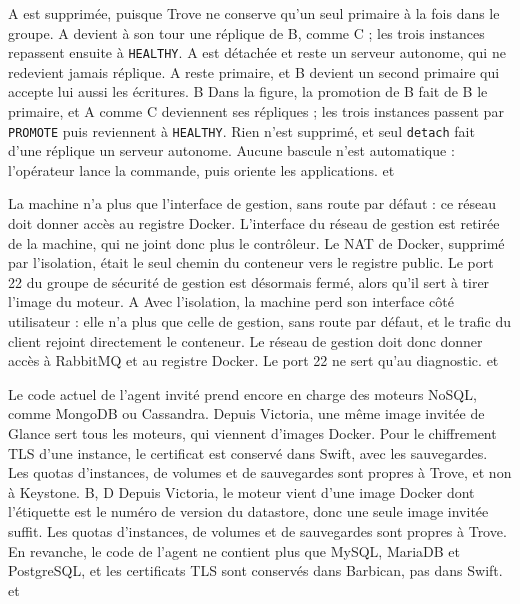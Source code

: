   {A est supprimée, puisque Trove ne conserve qu'un seul primaire à la fois dans le groupe.}
  {A devient à son tour une réplique de B, comme C ; les trois instances repassent ensuite à \texttt{HEALTHY}.}
  {A est détachée et reste un serveur autonome, qui ne redevient jamais réplique.}
  {A reste primaire, et B devient un second primaire qui accepte lui aussi les écritures.}
  {B}
  {Dans la figure, la promotion de B fait de B le primaire, et A comme C deviennent ses répliques ; les trois instances passent par \texttt{PROMOTE} puis reviennent à \texttt{HEALTHY}. Rien n'est supprimé, et seul \texttt{detach} fait d'une réplique un serveur autonome. Aucune bascule n'est automatique : l'opérateur lance la commande, puis oriente les applications.}
  { et }

  {La machine n'a plus que l'interface de gestion, sans route par défaut : ce réseau doit donner accès au registre Docker.}
  {L'interface du réseau de gestion est retirée de la machine, qui ne joint donc plus le contrôleur.}
  {Le NAT de Docker, supprimé par l'isolation, était le seul chemin du conteneur vers le registre public.}
  {Le port 22 du groupe de sécurité de gestion est désormais fermé, alors qu'il sert à tirer l'image du moteur.}
  {A}
  {Avec l'isolation, la machine perd son interface côté utilisateur : elle n'a plus que celle de gestion, sans route par défaut, et le trafic du client rejoint directement le conteneur. Le réseau de gestion doit donc donner accès à RabbitMQ et au registre Docker. Le port 22 ne sert qu'au diagnostic.}
  { et }

  {Le code actuel de l'agent invité prend encore en charge des moteurs NoSQL, comme MongoDB ou Cassandra.}
  {Depuis Victoria, une même image invitée de Glance sert tous les moteurs, qui viennent d'images Docker.}
  {Pour le chiffrement TLS d'une instance, le certificat est conservé dans Swift, avec les sauvegardes.}
  {Les quotas d'instances, de volumes et de sauvegardes sont propres à Trove, et non à Keystone.}
  {B, D}
  {Depuis Victoria, le moteur vient d'une image Docker dont l'étiquette est le numéro de version du datastore, donc une seule image invitée suffit. Les quotas d'instances, de volumes et de sauvegardes sont propres à Trove. En revanche, le code de l'agent ne contient plus que MySQL, MariaDB et PostgreSQL, et les certificats TLS sont conservés dans Barbican, pas dans Swift.}
  { et }

